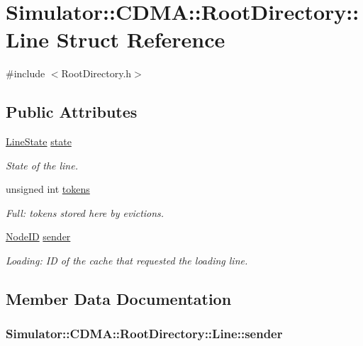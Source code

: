 \hypertarget{struct_simulator_1_1_c_d_m_a_1_1_root_directory_1_1_line}{\section{Simulator\+:\+:C\+D\+M\+A\+:\+:Root\+Directory\+:\+:Line Struct Reference}
\label{struct_simulator_1_1_c_d_m_a_1_1_root_directory_1_1_line}
}


{\ttfamily \#include $<$Root\+Directory.\+h$>$}

\subsection*{Public Attributes}
\begin{DoxyCompactItemize}
\item 
\hyperlink{class_simulator_1_1_c_d_m_a_1_1_root_directory_a54079b84b63737f0a28b9a28dbd5f1ee}{Line\+State} \hyperlink{struct_simulator_1_1_c_d_m_a_1_1_root_directory_1_1_line_a3312c09855e3fa9f551cd71f6d041e28}{state}
\begin{DoxyCompactList}\small\item\em State of the line. \end{DoxyCompactList}\item 
unsigned int \hyperlink{struct_simulator_1_1_c_d_m_a_1_1_root_directory_1_1_line_a6bb45639be5d1a1b3744d519fe31117c}{tokens}
\begin{DoxyCompactList}\small\item\em Full\+: tokens stored here by evictions. \end{DoxyCompactList}\item 
\hyperlink{class_simulator_1_1_c_d_m_a_a59272166fd32e642f3113c22cc756927}{Node\+I\+D} \hyperlink{struct_simulator_1_1_c_d_m_a_1_1_root_directory_1_1_line_adca9ada2c13f146f7250a873d7f2377e}{sender}
\begin{DoxyCompactList}\small\item\em Loading\+: I\+D of the cache that requested the loading line. \end{DoxyCompactList}\end{DoxyCompactItemize}


\subsection{Member Data Documentation}
\hypertarget{struct_simulator_1_1_c_d_m_a_1_1_root_directory_1_1_line_adca9ada2c13f146f7250a873d7f2377e}{
\subsubsection[{sender}]{ Simulator\+::\+C\+D\+M\+A\+::\+Root\+Directory\+::\+Line\+::sender}}\label{struct_simulator_1_1_c_d_m_a_1_1_root_directory_1_1_line_adca9ada2c13f146f7250a873d7f2377e}


